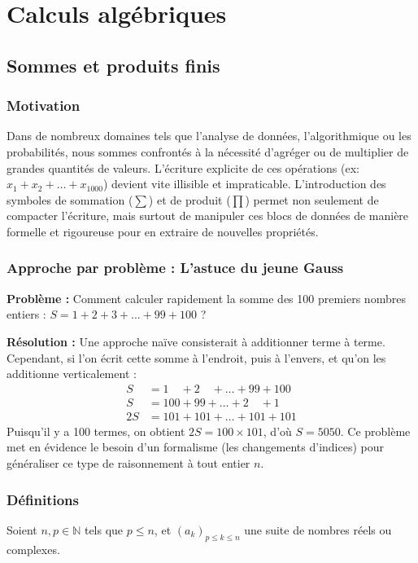 \chapter{Calculs algébriques}

\section{Sommes et produits finis}

\subsection{Motivation}
Dans de nombreux domaines tels que l'analyse de données, l'algorithmique ou les probabilités, nous sommes confrontés à la nécessité d'agréger ou de multiplier de grandes quantités de valeurs. L'écriture explicite de ces opérations (ex: $x_1 + x_2 + \dots + x_{1000}$) devient vite illisible et impraticable. L'introduction des symboles de sommation ($\sum$) et de produit ($\prod$) permet non seulement de compacter l'écriture, mais surtout de manipuler ces blocs de données de manière formelle et rigoureuse pour en extraire de nouvelles propriétés.

\subsection{Approche par problème : L'astuce du jeune Gauss}
\textbf{Problème :} Comment calculer rapidement la somme des 100 premiers nombres entiers : $S = 1 + 2 + 3 + \dots + 99 + 100$ ?

\textbf{Résolution :} Une approche naïve consisterait à additionner terme à terme. Cependant, si l'on écrit cette somme à l'endroit, puis à l'envers, et qu'on les additionne verticalement :
\begin{align*}
S &= 1 \quad + 2 \quad + \dots + 99 + 100 \\
S &= 100 + 99 + \dots + 2 \quad + 1 \\
\hline
2S &= 101 + 101 + \dots + 101 + 101
\end{align*}
Puisqu'il y a 100 termes, on obtient $2S = 100 \times 101$, d'où $S = 5050$. 
Ce problème met en évidence le besoin d'un formalisme (les changements d'indices) pour généraliser ce type de raisonnement à tout entier $n$.

\subsection{Définitions}
Soient $n, p \in \mathbb{N}$ tels que $p \le n$, et $(a_k)_{p \le k \le n}$ une suite de nombres réels ou complexes.

